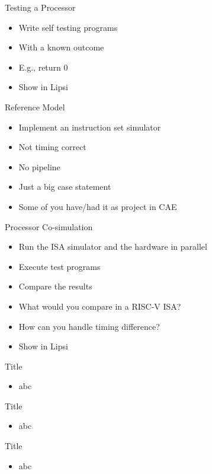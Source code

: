 \begin{frame}[fragile]{Testing a Processor}
\begin{itemize}
\item Write self testing programs
\item With a known outcome
\item E.g., return 0
\item Show in Lipsi
\end{itemize}
\end{frame}


\begin{frame}[fragile]{Reference Model}
\begin{itemize}
\item Implement an instruction set simulator
\item Not timing correct
\item No pipeline
\item Just a big case statement
\item Some of you have/had it as project in CAE
\end{itemize}
\end{frame}

\begin{frame}[fragile]{Processor Co-simulation}
\begin{itemize}
\item Run the ISA simulator and the hardware in parallel
\item Execute test programs
\item Compare the results
\item What would you compare in a RISC-V ISA?
\item How can you handle timing difference?
\item Show in Lipsi
\end{itemize}
\end{frame}

\begin{frame}[fragile]{Title}
\begin{itemize}
\item abc
\end{itemize}
\end{frame}

\begin{frame}[fragile]{Title}
\begin{itemize}
\item abc
\end{itemize}
\end{frame}

\begin{frame}[fragile]{Title}
\begin{itemize}
\item abc
\end{itemize}
\end{frame}

